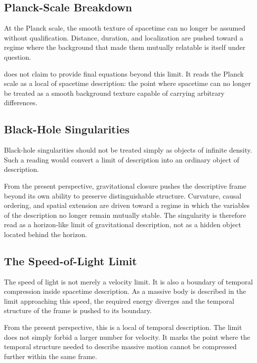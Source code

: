 \subsection{Planck-Scale Breakdown}

At the Planck scale,
the smooth texture of spacetime can no longer be assumed without
qualification.
Distance,
duration,
and localization are pushed toward a regime where the background
that made them mutually relatable is itself under question.

\VED{} does not claim to provide final equations beyond this limit.
It reads the Planck scale as a local \DH{} of spacetime description:
the point where spacetime can no longer be treated as a smooth
background texture capable of carrying arbitrary differences.

\subsection{Black-Hole Singularities}

Black-hole singularities should not be treated simply as objects of
infinite density.
Such a reading would convert a limit of description into an ordinary
object of description.

From the present perspective,
gravitational closure pushes the descriptive frame beyond its own
ability to preserve distinguishable structure.
Curvature,
causal ordering,
and spatial extension are driven toward a regime in which the
variables of the description no longer remain mutually stable.
The singularity is therefore read as a horizon-like limit of
gravitational description,
not as a hidden object located behind the horizon.

\subsection{The Speed-of-Light Limit}

The speed of light is not merely a velocity limit.
It is also a boundary of temporal compression inside spacetime
description.
As a massive body is described in the limit approaching this speed,
the required energy diverges and the temporal structure of the frame
is pushed to its boundary.

From the present perspective,
this is a local \DH{} of temporal description.
The limit does not simply forbid a larger number for velocity.
It marks the point where the temporal structure needed to describe
massive motion cannot be compressed further within the same frame.

